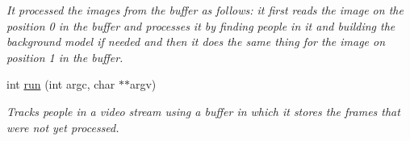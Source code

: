 \begin{DoxyCompactItemize}
\begin{DoxyCompactList}\small\item\em It processed the images from the buffer as follows: it first reads the image on the position 0 in the buffer and processes it by finding people in it and building the background model if needed and then it does the same thing for the image on position 1 in the buffer. \item\end{DoxyCompactList}\item 
int \hyperlink{classfindPersonStream_ac1f545534cdaab9094198a5dc2c2a79f}{run} (int argc, char $\ast$$\ast$argv)
\begin{DoxyCompactList}\small\item\em Tracks people in a video stream using a buffer in which it stores the frames that were not yet processed. \item\end{DoxyCompactList}\end{DoxyCompactItemize}
